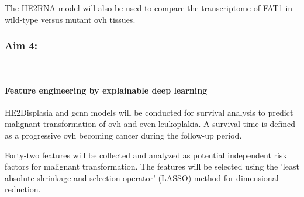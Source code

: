 \documentclass[12pt, a4paper]{article}
\begin{document}
The HE2RNA model will also be used to compare the transcriptome of FAT1 in wild-type versus mutant \acrshort{ovh} tissues.








\clearpage
\subsubsection*{Aim 4:}\\[0.5cm]


\paragraph{Feature engineering by explainable deep learning}




HE2Displasia and \acrfull{gcnn} models will be conducted for survival analysis to predict malignant transformation of \acrshort{ovh} and even leukoplakia.
A survival time is defined as a progressive \acrshort{ovh} becoming cancer during the follow-up period.


Forty-two features will be collected and analyzed as potential independent risk factors for malignant transformation. 
The features will be selected using the 'least absolute shrinkage and selection operator' (LASSO) method for dimensional reduction.
\end{document}
